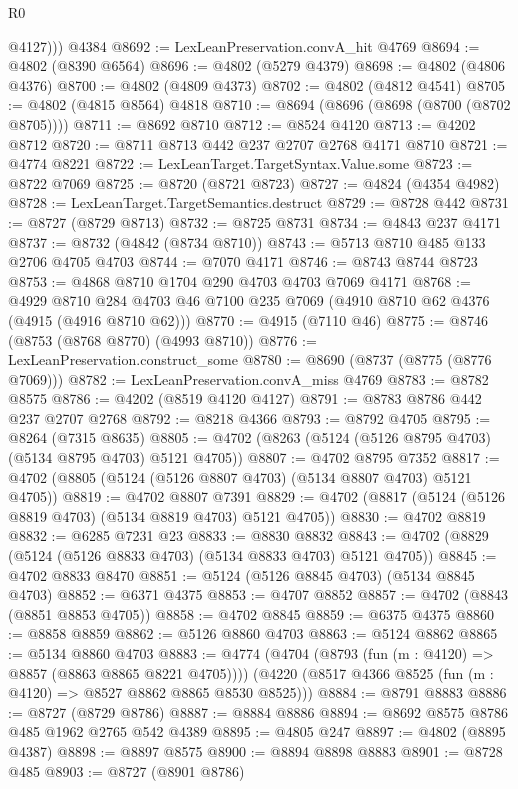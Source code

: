 \begin{lexlean}{R0}
\begin{coremodule}
          @4127)))
    @4384
@8692 := LexLeanPreservation.convA_hit @4769
@8694 := @4802 (@8390 @6564)
@8696 := @4802 (@5279 @4379)
@8698 := @4802 (@4806 @4376)
@8700 := @4802 (@4809 @4373)
@8702 := @4802 (@4812 @4541)
@8705 := @4802 (@4815 @8564) @4818
@8710 := @8694 (@8696 (@8698 (@8700 (@8702 @8705))))
@8711 := @8692 @8710
@8712 := @8524 @4120
@8713 := @4202 @8712
@8720 := @8711 @8713 @442 @237 @2707 @2768 @4171 @8710
@8721 := @4774 @8221
@8722 := LexLeanTarget.TargetSyntax.Value.some
@8723 := @8722 @7069
@8725 := @8720 (@8721 @8723)
@8727 := @4824 (@4354 @4982)
@8728 := LexLeanTarget.TargetSemantics.destruct
@8729 := @8728 @442
@8731 := @8727 (@8729 @8713)
@8732 := @8725 @8731
@8734 := @4843 @237 @4171
@8737 := @8732 (@4842 (@8734 @8710))
@8743 := @5713 @8710 @485 @133 @2706 @4705 @4703
@8744 := @7070 @4171
@8746 := @8743 @8744 @8723
@8753 := @4868 @8710 @1704 @290 @4703 @4703 @7069 @4171
@8768 := @4929
    @8710
    @284
    @4703
    @46
    @7100
    @235
    @7069
    (@4910 @8710 @62 @4376 (@4915 (@4916 @8710 @62)))
@8770 := @4915 (@7110 @46)
@8775 := @8746 (@8753 (@8768 @8770) (@4993 @8710))
@8776 := LexLeanPreservation.construct_some
@8780 := @8690 (@8737 (@8775 (@8776 @7069)))
@8782 := LexLeanPreservation.convA_miss @4769
@8783 := @8782 @8575
@8786 := @4202 (@8519 @4120 @4127)
@8791 := @8783 @8786 @442 @237 @2707 @2768
@8792 := @8218 @4366
@8793 := @8792 @4705
@8795 := @8264 (@7315 @8635)
@8805 := @4702 (@8263 (@5124 (@5126 @8795 @4703) (@5134 @8795 @4703) @5121 @4705))
@8807 := @4702 @8795 @7352
@8817 := @4702 (@8805 (@5124 (@5126 @8807 @4703) (@5134 @8807 @4703) @5121 @4705))
@8819 := @4702 @8807 @7391
@8829 := @4702 (@8817 (@5124 (@5126 @8819 @4703) (@5134 @8819 @4703) @5121 @4705))
@8830 := @4702 @8819
@8832 := @6285 @7231 @23
@8833 := @8830 @8832
@8843 := @4702 (@8829 (@5124 (@5126 @8833 @4703) (@5134 @8833 @4703) @5121 @4705))
@8845 := @4702 @8833 @8470
@8851 := @5124 (@5126 @8845 @4703) (@5134 @8845 @4703)
@8852 := @6371 @4375
@8853 := @4707 @8852
@8857 := @4702 (@8843 (@8851 @8853 @4705))
@8858 := @4702 @8845
@8859 := @6375 @4375
@8860 := @8858 @8859
@8862 := @5126 @8860 @4703
@8863 := @5124 @8862
@8865 := @5134 @8860 @4703
@8883 := @4774
    (@4704 (@8793 (fun (m : @4120) => @8857 (@8863 @8865 @8221 @4705))))
    (@4220 (@8517 @4366 @8525 (fun (m : @4120) => @8527 @8862 @8865 @8530 @8525)))
@8884 := @8791 @8883
@8886 := @8727 (@8729 @8786)
@8887 := @8884 @8886
@8894 := @8692 @8575 @8786 @485 @1962 @2765 @542 @4389
@8895 := @4805 @247
@8897 := @4802 (@8895 @4387)
@8898 := @8897 @8575
@8900 := @8894 @8898 @8883
@8901 := @8728 @485
@8903 := @8727 (@8901 @8786)

\end{coremodule}
\end{lexlean}

